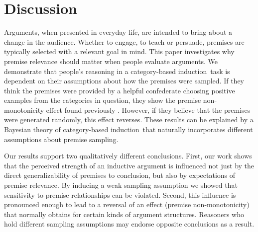 \documentclass[doc,12pt]{apa}
\newcommand{\cbi}{category-based induction}
\begin{document}
\section{Discussion}

%

%
Arguments, when presented in everyday life, are intended to bring about a change in the audience. Whether to engage, to teach or persuade, premises are typically selected with a relevant goal in mind.
This paper investigates why premise relevance should matter when people evaluate arguments.
%
We demonstrate that people's reasoning in a \cbi\ task is dependent on their assumptions about how the premises were sampled. If they think the premises were provided by a helpful confederate choosing positive examples from the categories in question, they show the premise non-monotonicity effect found previously \cite{MCSH03}. However, if they believe that the premises were generated randomly, this effect reverses. These results can be explained by a Bayesian theory of \cbi\ that naturally incorporates different assumptions about premise sampling.

%
Our results support two qualitatively different conclusions. First, our work shows that the perceived strength of an inductive argument is influenced not just by the direct generalizability of premises to conclusion,
but also by expectations of premise relevance. By inducing a weak sampling assumption we showed that sensitivity to premise relationships can be violated.
%
Second, this influence is pronounced enough to lead to a reversal of an effect (premise non-monotonicity) that normally obtains for certain kinds of argument structures.  Reasoners who hold different sampling assumptions may endorse opposite conclusions as a result.

\end{document}
